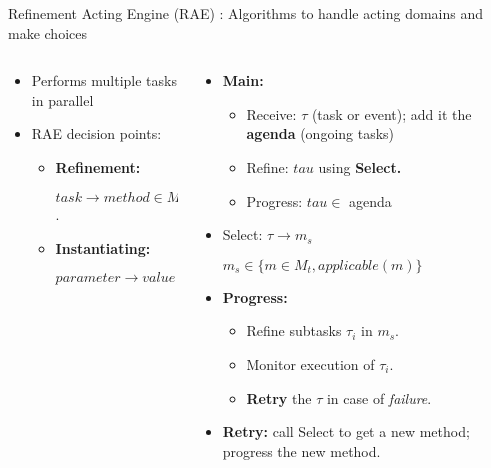 \begin{frame}{Refinement Acting Engine (RAE) : Algorithms to handle acting domains and make choices}
\begin{columns}
    \begin{column}{0.35\textwidth}
    \pause
    \setlength{\leftmargini}{-1pt}
    \begin{itemize}
        \item Performs multiple tasks in parallel
        \pause
        \item RAE decision points:
        \begin{itemize}
            \pause
            \item \textbf{Refinement:}
            
            $task \rightarrow  method \in M_t$.
            \pause
            \item \textbf{Instantiating:}
            
            $parameter \rightarrow value \in D_p$
        \end{itemize}
    \end{itemize}
    \end{column}
    \begin{column}{0.65\textwidth}
        \begin{itemize}
            \setlength{\leftmargini}{-1pt}
            \item \textbf{Main:} 
            \begin{itemize}
                \item Receive:  $\tau$ (task or event);
                add it the \textbf{agenda} ({ongoing tasks})
                \pause
                \item Refine: $tau$ using \textbf{Select.}
                \pause
                \item Progress: $tau \in$ agenda
            \end{itemize}
            \pause
            \item Select: $\tau \rightarrow m_s$
            
            $ m_s \in \{m \in M_t, applicable(m)\}$
            \pause
            \item \textbf{Progress:}
                \begin{itemize}
                \item Refine subtasks $\tau_i$ in $m_s$.    
                \item Monitor execution of $\tau_i$.
                \item \textbf{Retry} the $\tau$ in case of \emph{failure}.
                \end{itemize}
                \pause
            
            \item \textbf{Retry:} call Select to get a new method; progress the new method.
        \end{itemize}
    \end{column}
\end{columns}

    
\end{frame}

